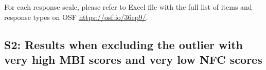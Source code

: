 \documentclass[
  english,
  man,floatsintext]{apa6}
\begin{document}
For each response scale, please refer to Excel file with the full list of items and response types on OSF \url{https://osf.io/36ep9/}.

\newpage
{}
\setcounter{section}{19}
\setcounter{figure}{0}
\setcounter{table}{0}

\hypertarget{s2-results-when-excluding-the-outlier-with-very-high-mbi-scores-and-very-low-nfc-scores}{%
\subsection{S2: Results when excluding the outlier with very high MBI scores and very low NFC scores}\label{s2-results-when-excluding-the-outlier-with-very-high-mbi-scores-and-very-low-nfc-scores}}

\begin{landscape}\begin{table}


\end{table}
\end{landscape}
\end{document}
